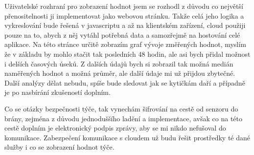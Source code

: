 Uživatelské rozhraní pro zobrazení hodnot jsem se rozhodl z důvodu co největší přenositelnosti ji implementovat jako 
webovou stránku. Takže celá jeho logika a vykreslování bude řešená v javascriptu a až na klientském zařízení, cloud 
použiji pouze na to, abych z něj vytáhl potřebná data a samozřejmě na hostování celé aplikace. Na této stránce určitě 
zobrazím graf vývoje změřených hodnot, myslím že v základu by mohlo stačit tak posledních 48 hodin, ale asi bych přidal 
možnost i delších časových úseků. Z dalších údajů bych si zobrazil tak možná medián naměřených hodnot a možná průměr, 
ale další údaje mi už přijdou zbytečné. Další analýzy dělat nebudu, spíše  bude sledovat jak se kytičkám daří a případně 
je po nasbírání zkušeností doplním.

Co se otázky bezpečnosti týče, tak vynechám šifrování na cestě od senzoru do brány, zejména z důvodu jednoduššího ladění 
a implementace, avšak co na této cestě doplním je elektronický podpis zprávy, aby se mi nikdo nefušoval do komunikace. 
Zabezpečení komunikace s cloudem už budu řešit prostředky té dané služby i co se zobrazení hodnot týče.
